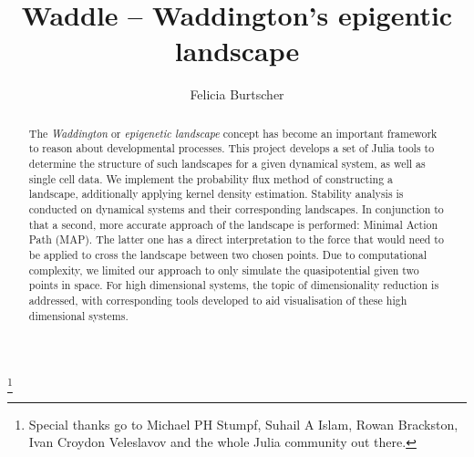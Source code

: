 \documentclass[journal, a4paper]{IEEEtran}
\begin{document}
	\title{Waddle -- Waddington's epigentic landscape}
	\author{Felicia Burtscher}
	\thanks{Special thanks go to Michael PH Stumpf, Suhail A Islam, Rowan Brackston, Ivan Croydon Veleslavov and the whole Julia community out there.}\\
	
\maketitle


\begin{abstract}
The \textit{Waddington} or \textit{epigenetic landscape} concept has become an important framework to reason about developmental processes. This project develops a set of Julia tools to determine the structure of such landscapes for a given dynamical system, as well as single cell data. We implement the probability flux method of constructing a landscape, additionally applying kernel density estimation. Stability analysis is conducted on dynamical systems and their corresponding landscapes. In conjunction to that a second, more accurate approach %
of the landscape is performed: Minimal Action Path (MAP). The latter one has a direct interpretation to the force that would need to be applied to cross the landscape between two chosen points. Due to computational complexity, we limited our approach to only simulate the quasipotential given two points in space. 
For high dimensional systems, the topic of dimensionality reduction is addressed, with corresponding tools developed to aid visualisation of these high dimensional systems. 
\end{abstract}
\end{document}
